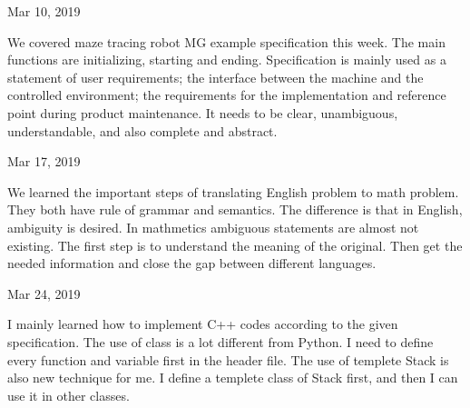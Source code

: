 \documentclass{article}
\begin{document}
\begin{flushleft}
Mar 10, 2019
\end{flushleft}
\par
We covered maze tracing robot MG example specification this week. The main functions are initializing, starting and ending. Specification is mainly used as a statement of user requirements; the interface between the machine and the controlled environment; the requirements for the implementation and reference point during product maintenance. It needs to be clear, unambiguous, understandable, and also complete and abstract.


\begin{flushleft}
Mar 17, 2019
\end{flushleft}
\par
We learned the important steps of translating English problem to math problem. They both have rule of grammar and semantics. The difference is that in English, ambiguity is desired. In mathmetics ambiguous statements are almost not existing. The first step is to understand the meaning of the original. Then get the needed information and close the gap between different languages.


\begin{flushleft}
Mar 24, 2019
\end{flushleft}
\par
I mainly learned how to implement C++ codes according to the given specification. The use of class is a lot different from Python. I need to define every function and variable first in the header file. The use of templete Stack is also new technique for me. I define a templete class of Stack first, and then I can use it in other classes.
\end{document}
